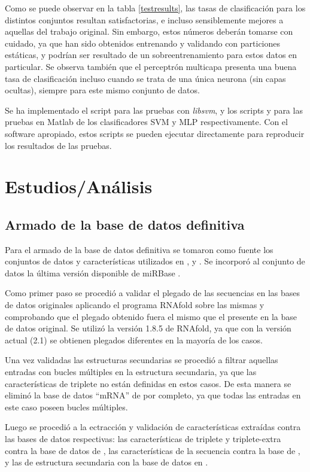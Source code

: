 \documentclass[12pt,bibliography=oldstyle,DIV=12,parskip=half-]{scrreprt}
\begin{document}
Como se puede observar en la tabla \ref{testresults}, las tasas de
clasificación para los distintos conjuntos resultan satisfactorias, e
incluso sensiblemente mejores a aquellas del trabajo original.  Sin
embargo, estos números deberán tomarse con cuidado, ya que han sido
obtenidos entrenando y validando con particiones estáticas, y podrían
ser resultado de un sobreentrenamiento para estos datos en
particular. Se observa también que el perceptrón multicapa presenta
una buena tasa de clasificación incluso cuando se trata de una única
neurona (sin capas ocultas), siempre para este mismo conjunto de
datos.

Se ha implementado el script  para las
pruebas con \emph{libsvm}, y los scripts  y
 para las pruebas en Matlab de los clasificadores
SVM y MLP respectivamente. Con el software apropiado, estos scripts
se pueden ejecutar directamente para reproducir los resultados de las
pruebas.
%
%
%

\chapter{Estudios/Análisis}
%
%
\section{Armado de la base de datos definitiva}
Para el armado de la base de datos definitiva se tomaron como fuente
los conjuntos de datos y características utilizados en \cite{xue},
\cite{ng} y \cite{batuwita}. Se incorporó al conjunto de datos
la última versión disponible de miRBase \cite{mirbase2}.

Como primer paso se procedió a validar el plegado de las secuencias en
las bases de datos originales aplicando el programa RNAfold sobre las
mismas y comprobando que el plegado obtenido fuera el mismo que el
presente en la base de datos original. Se utilizó la versión 1.8.5 de
RNAfold, ya que con la versión actual (2.1) se obtienen plegados
diferentes en la mayoría de los casos.

Una vez validadas las estructuras secundarias se procedió a filtrar
aquellas entradas con bucles múltiples en la estructura secundaria, ya
que las características de triplete no están definidas en estos casos.
De esta manera se eliminó la base de datos ``mRNA'' de \cite{ng} por
completo, ya que todas las entradas en este caso poseen bucles
múltiples.

Luego se procedió a la ectracción y validación de características
extraídas contra las bases de datos respectivas: las características
de triplete y triplete-extra contra la base de datos de \cite{xue},
las características de la secuencia contra la base de \cite{ng}, y las
de estructura secundaria con la base de datos en \cite{batuwita}.
\end{document}
